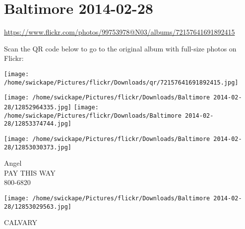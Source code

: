 \documentclass[10pt,letterpaper]{article}
\title{}
\author{}
\date{}
\begin{document}
\section*{Baltimore 2014-02-28}

\url{https://www.flickr.com/photos/99753978@N03/albums/72157641691892415}

Scan the QR code below to go to the original album with full-size photos on Flickr:

\texttt{[image: /home/swickape/Pictures/flickr/Downloads/qr/72157641691892415.jpg]}
\pagebreak

\texttt{[image: /home/swickape/Pictures/flickr/Downloads/Baltimore 2014-02-28/12852964335.jpg]}
\texttt{[image: /home/swickape/Pictures/flickr/Downloads/Baltimore 2014-02-28/12853374744.jpg]}

\vspace{0.25in}
\texttt{[image: /home/swickape/Pictures/flickr/Downloads/Baltimore 2014-02-28/12853030373.jpg]}

Angel\\
PAY THIS WAY\\
800{-}6820
\pagebreak

\texttt{[image: /home/swickape/Pictures/flickr/Downloads/Baltimore 2014-02-28/12853029563.jpg]}

CALVARY
\pagebreak
\end{document}

